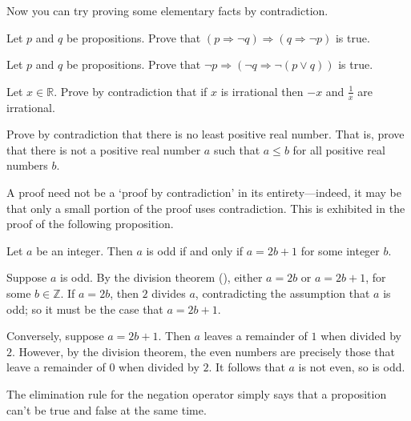 Now you can try proving some elementary facts by contradiction.

\begin{exercise}
Let $p$ and $q$ be propositions. Prove that $(p \Rightarrow \neg q) \Rightarrow (q \Rightarrow \neg p)$ is true.

\end{exercise}

\begin{exercise}
Let $p$ and $q$ be propositions. Prove that $\neg p \Rightarrow (\neg q \Rightarrow \neg(p \vee q))$ is true.

\end{exercise}

\begin{exercise}
\label{exNegationAndReciprocalOfIrrationalNumbers}
Let $x \in \mathbb{R}$. Prove by contradiction that if $x$ is irrational then $-x$ and $\frac{1}{x}$ are irrational.
\end{exercise}

\begin{exercise}
\label{exNoLeastPositiveReal}
Prove by contradiction that there is no least positive real number. That is, prove that there is not a positive real number $a$ such that $a \le b$ for all positive real numbers $b$.
\end{exercise}

A proof need not be a `proof by contradiction' in its entirety---indeed, it may be that only a small portion of the proof uses contradiction. This is exhibited in the proof of the following proposition.

\begin{proposition}
\label{propOddIffRemainderOfOne}
Let $a$ be an integer. Then $a$ is odd if and only if $a=2b+1$ for some integer $b$.
\end{proposition}
\begin{cproof}
Suppose $a$ is odd. By the division theorem (), either $a=2b$ or $a=2b+1$, for some $b \in \mathbb{Z}$. If $a=2b$, then $2$ divides $a$, contradicting the assumption that $a$ is odd; so it must be the case that $a=2b+1$.

Conversely, suppose $a=2b+1$. Then $a$ leaves a remainder of $1$ when divided by $2$. However, by the division theorem, the even numbers are precisely those that leave a remainder of $0$ when divided by $2$. It follows that $a$ is not even, so is odd.
\end{cproof}

The elimination rule for the negation operator \elimrule{\neg} simply says that a proposition can't be true and false at the same time.

